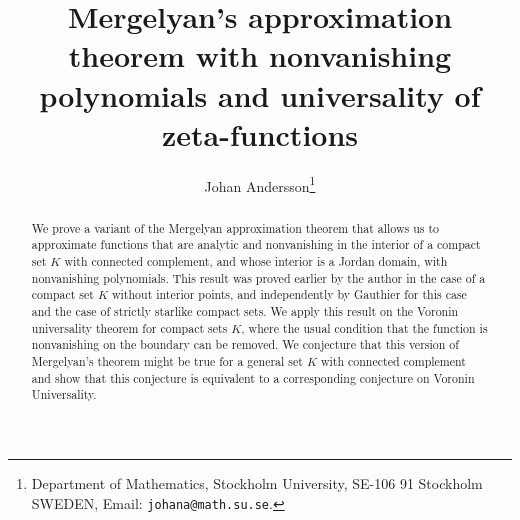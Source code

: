 \documentclass[11pt]{article}
\begin{document}
\title{Mergelyan's approximation theorem with nonvanishing polynomials and universality of zeta-functions}

\theoremstyle{plain}
 \usepackage{./extract}
\newtheorem{thm}{Theorem}
\newtheorem{lem}{Lemma}\renewcommand{\thelem}{\hskip -4 pt}
\newtheorem{cor}{Corollary}
\theoremstyle{definition} 
\newtheorem{example}{Example}
\newtheorem{prob}{Problem}\newtheorem{conj}{Conjecture}
\newtheorem{defn}{Definition}
\newtheorem{rem}{Remark}
\newtheorem{ack}{Acknowledgements}
\renewcommand{\theack}{\hskip -4 pt}
\def\cprime{$'$}
\newcommand{\C}{{\mathbb C}} 
\newcommand{\R}{{\mathbb R}} \newcommand{\N}{{\mathbb N}}
\newcommand{\Z}{{\mathbb Z}}
\newcommand{\abs}[1]{{\left| {#1} \right|}} \newcommand{\p}[1]{{\left(
      {#1} \right)}} \newcommand{\jtf}[1]{{#1}^{\diamond}}

\newcommand{\Oh}[1]{{O \p{#1}}}

\renewcommand{\Re}{\operatorname{Re}} \renewcommand{\Im}{\operatorname{Im}} 





\author{Johan Andersson\thanks{Department of Mathematics, Stockholm University, 
SE-106 91 Stockholm SWEDEN, Email: {\texttt {johana@math.su.se}}.}}

\date{}
\maketitle

\begin{abstract}We prove a variant of the Mergelyan approximation theorem that allows us to approximate functions that are analytic and nonvanishing in the interior of a compact set $K$ with connected complement, and whose interior is a Jordan domain, with nonvanishing polynomials. This result was proved earlier by the author in the case of a compact set $K$ without interior points, and independently by Gauthier for this case and the case of strictly starlike compact sets. We apply this result on the Voronin universality theorem for compact sets $K$, where the usual condition that the function is nonvanishing on the boundary can be removed. We conjecture that this version of Mergelyan's theorem might be true for a general set $K$ with connected complement and show that this conjecture is equivalent to a corresponding conjecture on  Voronin Universality. 
\end{abstract}
\end{document}
